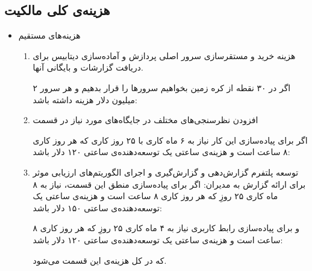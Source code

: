 \documentclass[12pt]{article}
\begin{document}
\subsection{هزینه‌ی کلی مالکیت }
\begin{itemize}
    \item 
    هزینه‌های مستقیم
    
    \begin{enumerate}
        \item 
        هزینه خرید و مستقرسازی سرور اصلی پردازش  و آماده‌سازی دیتابیس برای دریافت گزارشات و بایگانی آنها.
        
        اگر در ۳۰ نقطه از کره زمین بخواهیم سرور‌ها را قرار بدهیم و هر سرور ۲ میلیون دلار هزینه داشته باشد:
        
        \item 
        افزودن نظرسنجی‌های مختلف در جایگاه‌های مورد نیاز در قسمت 
        
        اگر برای پیاده‌سازی این کار نیاز به ۶ ماه کاری با ۲۵ روز کاری که هر روز کاری ۸ ساعت است و هزینه‌ی ساعتی یک توسعه‌دهنده‌ی  ساعتی ۱۲۰ دلار باشد:
        \begin{flushleft}
        \end{flushleft}
        
        \item
        توسعه پلتفرم گزارش‌دهی و گزارش‌گیری و اجرای الگوریتم‌های ارزیابی موثر برای ارائه گزارش به مدیران:
        اگر برای پیاده‌سازی منطق این قسمت، نیاز به ۸ ماه کاری ۲۵ روزِ که هر روز کاری ۸ ساعت است و هزینه‌ی ساعتی یک توسعه‌دهنده‌ی  ساعتی ۱۵۰ دلار باشد:
        \begin{flushleft}
        \end{flushleft}
        
        و برای پیاده‌سازی رابط کاربری نیاز به ۴ ماه کاری ۲۵ روزِ که هر روز کاری ۸ ساعت است و هزینه‌ی ساعتی یک توسعه‌دهنده‌ی  ساعتی ۱۲۰ دلار باشد:
        \begin{flushleft}
        \end{flushleft}
        
        که در کل 
        هزینه‌ی این قسمت می‌شود.
    \end{enumerate}



\end{itemize}
\end{document}
